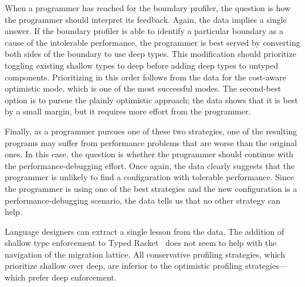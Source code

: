 When a programmer has reached for the boundary profiler, the question is how the
programmer should interpret its feedback. Again, the data implies a single
answer.  If the boundary profiler is able to identify a particular boundary as a
cause of the intolerable performance, the programmer is best served by
converting both sides of the boundary to use deep types. This modification
should prioritize toggling existing shallow types to deep before adding deep
types to untyped components. Prioritizing in this order follows from the data
for the cost-aware optimistic mode, which is one of the most successful modes.
The second-best option is to pursue the
plainly optimistic approach; the data shows that it is best by a small margin,
but it requires more effort from the programmer. 

Finally, as a programmer pursues one of these two strategies, one of the resulting
programs may suffer from performance problems that are worse than the original
ones. In this case, the question is whether the programmer should continue with
the performance-debugging effort. Once again, the data clearly suggests that the
programmer is unlikely to find a configuration with tolerable performance. Since
the programmer is using one of the best strategies and the new
configuration is a performance-debugging scenario, the data tells us that no
other strategy can help.


Language designers can extract a single lesson from the data.
The addition of shallow type enforcement to
Typed Racket~\cite{g-deep-shallow} does not seem to help with the navigation of the migration
lattice. All conservative profiling strategies, which prioritize shallow over
deep, are inferior to the optimistic profiling strategies---which prefer deep
enforcement. 

